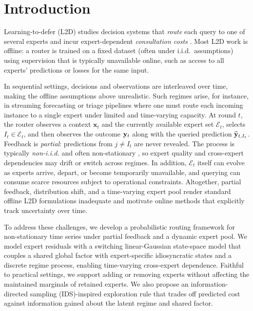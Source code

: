 \section{Introduction}

Learning-to-defer (L2D) studies decision systems that \emph{route} each query to one of several experts and incur expert-dependent
\emph{consultation costs} \citep{madras2018predict,mozannar2021consistent,Narasimhan,mao2023twostage, montreuil2025ask}.
Most L2D work is offline: a router is trained on a fixed dataset (often under i.i.d.\ assumptions) using supervision that is typically unavailable online,
such as access to all experts' predictions or losses for the same input.


In sequential settings, decisions and observations are interleaved over time, making the offline assumptions above unrealistic.
Such regimes arise, for instance, in streaming forecasting or triage pipelines where one must route each incoming instance to a single expert under limited and time-varying capacity.
At round $t$, the router observes a context $\mathbf{x}_t$ and the currently available expert set $\mathcal{E}_t$, selects $I_t \in \mathcal{E}_t$, and then observes the outcome $\mathbf{y}_t$ along with the queried prediction $\widehat{\mathbf{y}}_{t,I_t}$.
Feedback is \emph{partial}: predictions from $j\neq I_t$ are never revealed.
The process is typically \emph{non-i.i.d.} and often non-stationary \citep{hamilton2020time, sezer2020financial}, so expert quality and cross-expert dependencies may drift or switch across regimes.
In addition, $\mathcal{E}_t$ itself can evolve as experts arrive, depart, or become temporarily unavailable, and querying can consume scarce resources subject to operational constraints.
Altogether, partial feedback, distribution shift, and a time-varying expert pool render standard offline L2D formulations inadequate and motivate online methods that explicitly track uncertainty over time.



To address these challenges, we develop a probabilistic routing framework for non-stationary time series
under partial feedback and a dynamic expert pool.
We model expert residuals with a switching linear-Gaussian state-space
\citep{ghahramani2000variational, linderman2016recurrent, hu2024modeling} model
that couples a shared global factor with
expert-specific idiosyncratic states and a discrete regime process, enabling time-varying cross-expert dependence.
Faithful to practical settings, we support adding or removing experts without affecting the maintained marginals of retained experts.
We also propose an information-directed sampling (IDS)-inspired exploration rule \citep{russo2014learning} that trades off predicted cost against information gained about the latent regime and shared factor.

